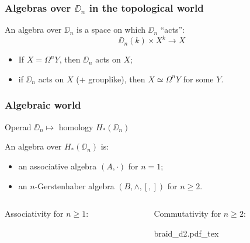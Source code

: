 \documentclass{beamer}
\newcommand{\inklude}[2]{
  \begin{center}
    \def\svgwidth{#1\linewidth} {#2.pdf_tex}
  \end{center}
}
\begin{document}
\begin{frame}
  \frametitle{Algebras over $\DD_{n}$ in the topological world}
  An \alert{algebra} over $\DD_{n}$ is a space on which $\DD_{n}$ ``acts'':
  \[ \DD_{n}(k) \times X^{k} \to X \]

  \pause
  \begin{theorem}
    \begin{itemize}
    \item If $X = \Omega^{n} Y$, then $\DD_{n}$ acts on $X$;
    \item if $\DD_{n}$ acts on $X$ (+ grouplike), then $X \simeq \Omega^{n} Y$ for some $Y$.
  \end{itemize}
  \end{theorem}
\end{frame}

\begin{frame}
  \frametitle{Algebraic world}
  Operad $\DD_{n} \mapsto$ homology $H_{*}(\DD_{n})$

  \pause
  \begin{theorem}[Cohen 1976]
    An algebra over $H_{*}(\DD_{n})$ is:
    \begin{itemize}
    \item<2-> an associative algebra $(A, \cdot)$ for $n = 1$;
    \item<3-> an $n$-Gerstenhaber algebra $(B, \wedge, [,])$ for $n \geq 2$.
    \end{itemize}
  \end{theorem}

  \begin{columns}
    \begin{column}{0.5\linewidth}
      \pause[2]
      Associativity for $n \geq 1$:
      \begin{center}
      \end{center}
    \end{column}
    \begin{column}{0.5\linewidth}
      \pause[3]
      Commutativity for $n \geq 2$:
      \inklude{.5}{braid_d2}
    \end{column}
  \end{columns}
\end{frame}
\end{document}
